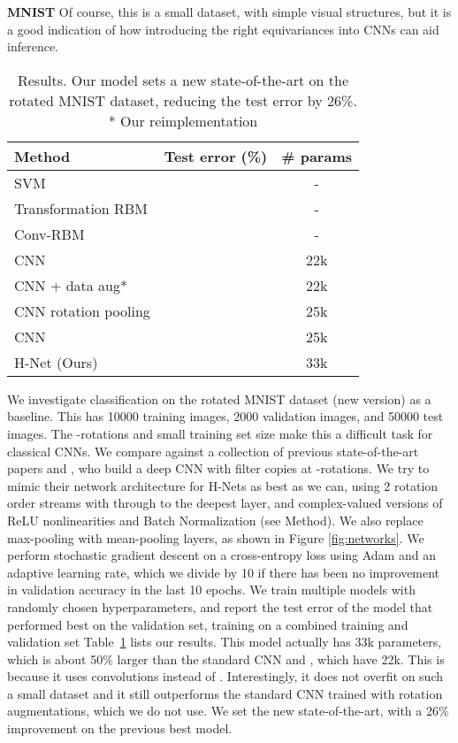 \documentclass[10pt,twocolumn,letterpaper]{article}
\begin{document}
\textbf{MNIST}
Of course, this is a small dataset, with simple visual structures, but it is a 
good indication of how introducing the right equivariances into CNNs can aid 
inference.
\begin{table}[t]
  \begin{center}
    {
    \begin{tabular}{|l|c|c|}
    \hline
    Method & Test error (\%) & \# params\\
    \hline\hline
    SVM \cite{larochelle2007deep}						& 		& -\\
    Transformation RBM \cite{sohn2012local}				&  		& -\\
    Conv-RBM \cite{schmidt2012priors} 					&  		& -\\
    CNN \cite{cohen2016group}							&  		& 22k\\
    CNN \cite{cohen2016group} + data aug*				&  		& 22k\\
    CNN rotation pooling \cite{cohen2016group}		& 		& 25k\\
    CNN \cite{cohen2016group} 						& 		& 25k\\
    H-Net (Ours)										&  	& 33k\\
    \hline
    \end{tabular}
    }
  \end{center}
  \caption{Results. Our model sets a new state-of-the-art on the 
  rotated MNIST dataset, reducing the test error by 26\%. * Our
  reimplementation}
  \label{tab:MNIST}
\end{table}
We investigate classification on the rotated MNIST dataset (new version) \cite{larochelle2007deep} 
as a baseline. This has 10000 training images, 2000 validation images, and
50000 test images. The -rotations and small training set
size make this a difficult task for classical CNNs. We compare against 
a collection of previous state-of-the-art papers and 
\cite{cohen2016group}, who build a deep CNN with filter copies at 
-rotations. We try to mimic their network architecture for
H-Nets as best as we can, using 2 rotation order streams with  
through to the deepest layer, and complex-valued versions of ReLU 
nonlinearities and Batch Normalization (see Method). We also replace
max-pooling with mean-pooling layers, as shown in Figure \ref{fig:networks}. 
We perform stochastic gradient descent on a cross-entropy loss using 
Adam \cite{kingma2014adam} and an adaptive learning rate, which we divide by 10 if there has 
been no improvement in validation accuracy in the last 10 epochs. We 
train multiple models with randomly chosen hyperparameters, and report 
the test error of the model that performed best on the validation set, 
training on a combined training and validation set Table~\ref{tab:MNIST} 
lists our results. This model actually has 33k parameters, which is about 50\%
larger than the standard CNN and \cite{cohen2016group}, which have 22k. 
This is because it uses  convolutions instead of .
Interestingly, it does not overfit on such a small dataset and it still
outperforms the standard CNN trained with rotation augmentations, which
we do not use. We set the new state-of-the-art, with a 26\% 
improvement on the previous best model.
\end{document}
